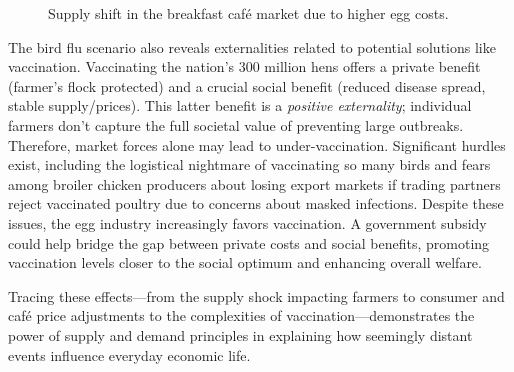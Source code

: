 \documentclass[12pt]{article}
\begin{document}
\begin{doublespace}
\begin{figure}[H]
\caption{Supply shift in the breakfast caf\'{e} market due to higher egg costs.}
\label{fig:cafe_market}
\end{figure}

The bird flu scenario also reveals externalities related to potential solutions like vaccination. Vaccinating the nation's 300 million hens offers a private benefit (farmer's flock protected) and a crucial social benefit (reduced disease spread, stable supply/prices). This latter benefit is a \emph{positive externality}; individual farmers don't capture the full societal value of preventing large outbreaks. Therefore, market forces alone may lead to under-vaccination. Significant hurdles exist, including the logistical nightmare of vaccinating so many birds and fears among broiler chicken producers about losing export markets if trading partners reject vaccinated poultry due to concerns about masked infections. Despite these issues, the egg industry increasingly favors vaccination. A government subsidy could help bridge the gap between private costs and social benefits, promoting vaccination levels closer to the social optimum and enhancing overall welfare.

Tracing these effects—from the supply shock impacting farmers to consumer and café price adjustments to the complexities of vaccination—demonstrates the power of supply and demand principles in explaining how seemingly distant events influence everyday economic life.

\end{doublespace}
\end{document}

